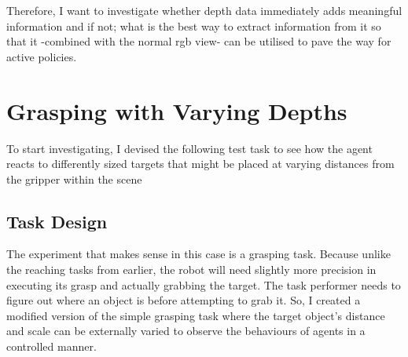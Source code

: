 Therefore, I want to investigate whether depth data immediately adds meaningful information and if not; what is the best way to extract information from it so that it -combined with the normal rgb view- can be utilised to pave the way for active policies.

\section{Grasping with Varying Depths}
To start investigating, I devised the following test task to see how the agent reacts to differently sized targets that might be placed at varying distances from the gripper within the scene

\subsection{Task Design}
The experiment that makes sense in this case is a grasping task. Because unlike the reaching tasks from earlier, the robot will need slightly more precision in executing its grasp and actually grabbing the target. The task performer needs to figure out where an object is before attempting to grab it. So, I created a modified version of the simple grasping task where the target object's distance and scale can be externally varied to observe the behaviours of agents in a controlled manner.

